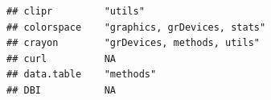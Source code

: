 \documentclass[]{article}
\begin{document}
\begin{verbatim}
## clipr         "utils"                                                                                                                                                                                                                                                                                                                                                                                                                                                                               
## colorspace    "graphics, grDevices, stats"                                                                                                                                                                                                                                                                                                                                                                                                                                                          
## crayon        "grDevices, methods, utils"                                                                                                                                                                                                                                                                                                                                                                                                                                                           
## curl          NA                                                                                                                                                                                                                                                                                                                                                                                                                                                                                    
## data.table    "methods"                                                                                                                                                                                                                                                                                                                                                                                                                                                                             
## DBI           NA                                                                                                                                                                                                                                                                                                                                                                                                                                                                                    

\end{verbatim}
\end{document}
